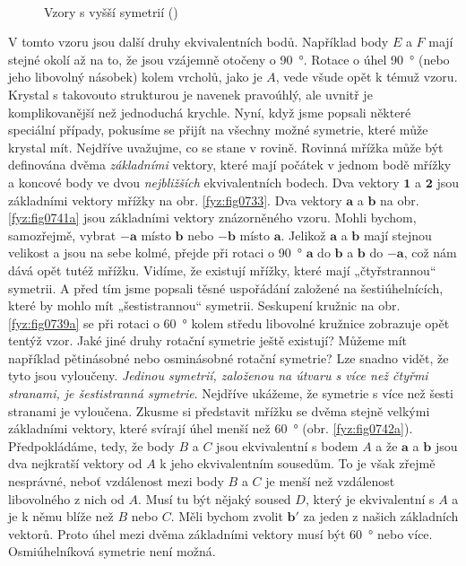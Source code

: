     \begin{figure}[ht!]    %
      \centering
                     \\
      \caption{Vzory s vyšší symetrií (\cite[s.~549]{Feynman02})}
      \label{fyz:fig0741}
    \end{figure}

    V tomto vzoru jsou další druhy ekvivalentních bodů. Například body \(E\) a \(F\) mají stejné 
    okolí až na to, že jsou vzájemně otočeny o \qty{90}{\degree}. Rotace o úhel \qty{90}{\degree} 
    (nebo jeho libovolný násobek) kolem vrcholů, jako je \(A\), vede všude opět k témuž vzoru. 
    Krystal s takovouto strukturou je navenek pravoúhlý, ale uvnitř je komplikovanější než 
    jednoduchá krychle. Nyní, když jsme popsali některé speciální případy, pokusíme se přijít na 
    všechny možné symetrie, které může krystal mít. Nejdříve uvažujme, co se stane v rovině. 
    Rovinná mřížka může být definována dvěma \emph{základními} vektory, které mají počátek v jednom 
    bodě mřížky a koncové body ve dvou \emph{nejbližších} ekvivalentních bodech. Dva vektory 
    \(\bm{1}\) a \(\bm{2}\) jsou základními vektory mřížky na obr. \ref{fyz:fig0733}. Dva vektory 
    \(\bm{a}\) a \(\bm{b}\) na obr. \ref{fyz:fig0741a} jsou základními vektory znázorněného vzoru. 
    Mohli bychom, samozřejmě, vybrat \(\bm{-a}\) místo \(\bm{b}\) nebo \(\bm{-b}\) místo 
    \(\bm{a}\). Jelikož \(\bm{a}\) a \(\bm{b}\) mají stejnou velikost a jsou na sebe kolmé, přejde 
    při rotaci o \qty{90}{\degree} \(\bm{a}\) do \(\bm{b}\) a \(\bm{b}\) do \(\bm{-a}\), což nám 
    dává opět tutéž mřížku. Vidíme, že existují mřížky, které mají „čtyřstrannou“ symetrii. A před 
    tím jsme popsali těsné uspořádání založené na šestiúhelnících, které by mohlo mít 
    „šestistrannou“ symetrii. Seskupení kružnic na obr. \ref{fyz:fig0739a} se při rotaci o 
    \qty{60}{\degree} kolem středu libovolné kružnice zobrazuje opět tentýž vzor. Jaké jiné druhy 
    rotační symetrie ještě existují? Můžeme mít například pětinásobné nebo osminásobné rotační 
    symetrie? Lze snadno vidět, že tyto jsou vyloučeny.\emph{ Jedinou symetrií, založenou na útvaru 
    s více než čtyřmi stranami, je šestistranná symetrie}. Nejdříve ukážeme, že symetrie s více než 
    šesti stranami je vyloučena. Zkusme si představit mřížku se dvěma stejně velkými základními 
    vektory, které svírají úhel menší než \qty{60}{\degree} (obr. \ref{fyz:fig0742a}). Předpokládáme, 
    tedy, že body \(B\) a \(C\) jsou ekvivalentní s bodem \(A\) a že \(\bm{a}\) a \(\bm{b}\) jsou 
    dva nejkratší vektory od \(A\) k jeho ekvivalentním sousedům. To je však zřejmě nesprávné, 
    neboť vzdálenost mezi body \(B\) a \(C\) je menší než vzdálenost libovolného z nich od \(A\). 
    Musí tu být nějaký soused \(D\), který je ekvivalentní s \(A\) a je k němu blíže než \(B\) nebo 
    \(C\). Měli bychom zvolit \(\bm{b'}\) za jeden z našich základních vektorů. Proto úhel mezi 
    dvěma základními vektory musí být \qty{60}{\degree} nebo více. Osmiúhelníková symetrie není 
    možná.

